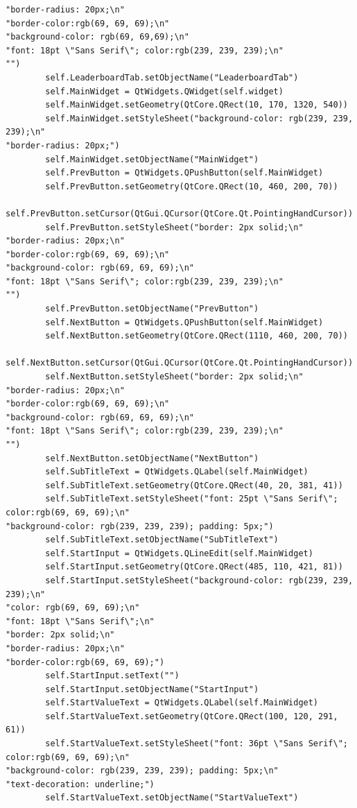 \documentclass{article}
\begin{document}
\begin{lstlisting}
"border-radius: 20px;\n"
"border-color:rgb(69, 69, 69);\n"
"background-color: rgb(69, 69,69);\n"
"font: 18pt \"Sans Serif\"; color:rgb(239, 239, 239);\n"
"")
        self.LeaderboardTab.setObjectName("LeaderboardTab")
        self.MainWidget = QtWidgets.QWidget(self.widget)
        self.MainWidget.setGeometry(QtCore.QRect(10, 170, 1320, 540))
        self.MainWidget.setStyleSheet("background-color: rgb(239, 239, 239);\n"
"border-radius: 20px;")
        self.MainWidget.setObjectName("MainWidget")
        self.PrevButton = QtWidgets.QPushButton(self.MainWidget)
        self.PrevButton.setGeometry(QtCore.QRect(10, 460, 200, 70))
        self.PrevButton.setCursor(QtGui.QCursor(QtCore.Qt.PointingHandCursor))
        self.PrevButton.setStyleSheet("border: 2px solid;\n"
"border-radius: 20px;\n"
"border-color:rgb(69, 69, 69);\n"
"background-color: rgb(69, 69, 69);\n"
"font: 18pt \"Sans Serif\"; color:rgb(239, 239, 239);\n"
"")
        self.PrevButton.setObjectName("PrevButton")
        self.NextButton = QtWidgets.QPushButton(self.MainWidget)
        self.NextButton.setGeometry(QtCore.QRect(1110, 460, 200, 70))
        self.NextButton.setCursor(QtGui.QCursor(QtCore.Qt.PointingHandCursor))
        self.NextButton.setStyleSheet("border: 2px solid;\n"
"border-radius: 20px;\n"
"border-color:rgb(69, 69, 69);\n"
"background-color: rgb(69, 69, 69);\n"
"font: 18pt \"Sans Serif\"; color:rgb(239, 239, 239);\n"
"")
        self.NextButton.setObjectName("NextButton")
        self.SubTitleText = QtWidgets.QLabel(self.MainWidget)
        self.SubTitleText.setGeometry(QtCore.QRect(40, 20, 381, 41))
        self.SubTitleText.setStyleSheet("font: 25pt \"Sans Serif\"; color:rgb(69, 69, 69);\n"
"background-color: rgb(239, 239, 239); padding: 5px;")
        self.SubTitleText.setObjectName("SubTitleText")
        self.StartInput = QtWidgets.QLineEdit(self.MainWidget)
        self.StartInput.setGeometry(QtCore.QRect(485, 110, 421, 81))
        self.StartInput.setStyleSheet("background-color: rgb(239, 239, 239);\n"
"color: rgb(69, 69, 69);\n"
"font: 18pt \"Sans Serif\";\n"
"border: 2px solid;\n"
"border-radius: 20px;\n"
"border-color:rgb(69, 69, 69);")
        self.StartInput.setText("")
        self.StartInput.setObjectName("StartInput")
        self.StartValueText = QtWidgets.QLabel(self.MainWidget)
        self.StartValueText.setGeometry(QtCore.QRect(100, 120, 291, 61))
        self.StartValueText.setStyleSheet("font: 36pt \"Sans Serif\"; color:rgb(69, 69, 69);\n"
"background-color: rgb(239, 239, 239); padding: 5px;\n"
"text-decoration: underline;")
        self.StartValueText.setObjectName("StartValueText")

\end{lstlisting}
\end{document}
